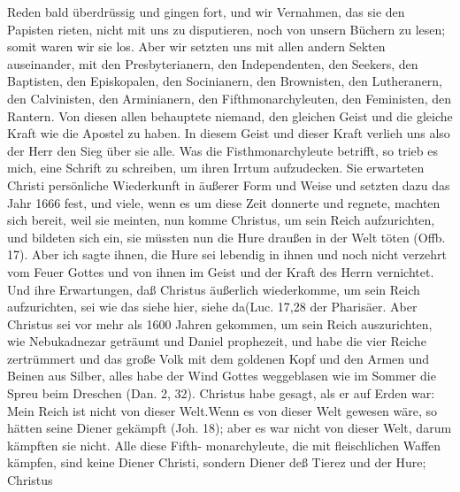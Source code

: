 Reden bald überdrüssig und gingen fort, und wir Vernahmen,
das sie den Papisten rieten, nicht mit uns zu disputieren, noch
von unsern Büchern zu lesen; somit waren wir sie los. Aber
wir setzten uns mit allen andern Sekten auseinander, mit den
Presbyterianern, 
den Independenten, 
den Seekers, 
den Baptisten,
den Episkopalen, 
den Socinianern, 
den Brownisten, 
den Lutheranern,
den Calvinisten, 
den Arminianern, 
den Fifthmonarchyleuten, 
den Feministen, 
den Rantern. 
Von diesen allen behauptete niemand,
den gleichen Geist und die gleiche Kraft wie die Apostel zu haben.
In diesem Geist und dieser Kraft verlieh uns also der Herr den
Sieg über sie alle. Was die Fisthmonarchyleute betrifft, so trieb
es mich, eine Schrift zu schreiben, um ihren Irrtum aufzudecken.
Sie erwarteten Christi persönliche Wiederkunft in äußerer Form
und Weise und setzten dazu das Jahr 1666 fest, und viele, wenn
es um diese Zeit donnerte und regnete, machten sich bereit, weil
sie meinten, nun komme Christus, um sein Reich aufzurichten,
und bildeten sich ein, sie müssten nun die Hure draußen in der
Welt töten (Offb. 17). Aber ich sagte ihnen, 
die Hure sei lebendig
in ihnen und noch nicht verzehrt vom Feuer Gottes und von
ihnen im Geist und der Kraft des Herrn vernichtet. Und ihre
Erwartungen, daß Christus äußerlich wiederkomme, um sein Reich
aufzurichten, sei wie das \glqq siehe hier, siehe da\grqq (Luc. 
17,28 der
Pharisäer. Aber Christus sei vor mehr als 1600 Jahren gekommen, 
um sein Reich auszurichten, wie Nebukadnezar 
geträumt und Daniel prophezeit, und 
habe die vier Reiche zertrümmert und
das große Volk mit dem goldenen Kopf und den Armen und
Beinen aus Silber, alles habe der Wind Gottes weggeblasen
wie im Sommer die Spreu beim Dreschen (Dan. 2, 32).
Christus habe gesagt, als er auf Erden war: \glqq Mein Reich ist
nicht von dieser Welt.\grqq Wenn es von dieser Welt gewesen wäre,
so hätten seine Diener gekämpft (Joh. 18); aber es war nicht
von dieser Welt, darum kämpften sie nicht. Alle diese Fifth-
monarchyleute, die mit fleischlichen Waffen kämpfen, sind keine
Diener Christi, sondern Diener deß Tierez und der Hure; Christus
